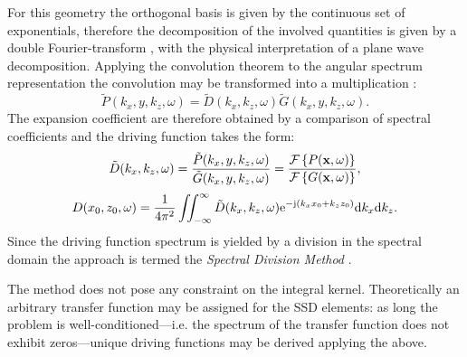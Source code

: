 For this geometry the orthogonal basis is given by the continuous set of exponentials, therefore the decomposition of the involved quantities is given by a double Fourier-transform \cite{Ahrens2012, Arfken2005,Schultz2014:Comparing_approaches}, with the physical interpretation of a plane wave decomposition.
Applying the convolution theorem to the angular spectrum representation the convolution may be transformed into a multiplication \cite{Girod2001}:
\begin{equation}
\tilde{P}(k_x,y,k_z, \omega) = \tilde{D}(k_x,k_z, \omega)  \tilde{G}(k_x,y,k_z, \omega).
\end{equation}
%
The expansion coefficient are therefore obtained by a comparison of spectral coefficients and the driving function takes the form:
\begin{equation}
\tilde{D}(k_x,k_z,\omega) = \frac{\tilde{P}(k_x,y,k_z, \omega)}{ \tilde{G}(k_x,y,k_z, \omega)} = 
\frac{\mathcal{F}\left\{ P(\mathbf{x},\omega) \right\} }
{  \mathcal{F}\left\{ G(\mathbf{x},\omega) \right\} },
\label{Eq:Theory:Dkxkz}
\end{equation}
\begin{equation}
D(x_0,z_0,\omega) = \frac{1}{4\pi^2} \iint_{-\infty}^{\infty} \tilde{D}(k_x,k_z, \omega) \mathrm{e}^{-\mathrm{j} (k_x x_0 + k_z z_0)} \mathrm{d} k_x \mathrm{d} k_z.
\label{Eq:Theory:Dkx_inverse_Fourier}
\end{equation}
Since the driving function spectrum is yielded by a division in the spectral domain the approach is termed the \emph{Spectral Division Method} \cite{Ahrens2010a, Ahrens2012:Ambisonics_for_planar_linear, Ahrens2011:icassp, Ahrens2010:Ambisonics_w_planar_linear}.

The method does not pose any constraint on the integral kernel. 
Theoretically an arbitrary transfer function may be assigned for the SSD elements: as long the problem is well-conditioned---i.e. the spectrum of the transfer function does not exhibit zeros---unique driving functions may be derived applying the above.

